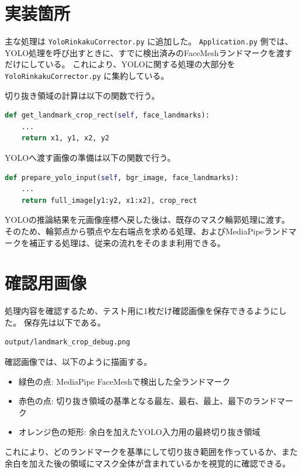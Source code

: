 \documentclass[uplatex,dvipdfmx]{jsarticle}
\begin{document}
\section{実装箇所}

主な処理は \verb|YoloRinkakuCorrector.py| に追加した。
\verb|Application.py| 側では、YOLO処理を呼び出すときに、すでに検出済みのFaceMeshランドマークを渡すだけにしている。
これにより、YOLOに関する処理の大部分を \verb|YoloRinkakuCorrector.py| に集約している。

切り抜き領域の計算は以下の関数で行う。

\begin{lstlisting}[language=Python]
def get_landmark_crop_rect(self, face_landmarks):
    ...
    return x1, y1, x2, y2
\end{lstlisting}

YOLOへ渡す画像の準備は以下の関数で行う。

\begin{lstlisting}[language=Python]
def prepare_yolo_input(self, bgr_image, face_landmarks):
    ...
    return full_image[y1:y2, x1:x2], crop_rect
\end{lstlisting}

YOLOの推論結果を元画像座標へ戻した後は、既存のマスク輪郭処理に渡す。
そのため、輪郭点から顎点や左右端点を求める処理、およびMediaPipeランドマークを補正する処理は、従来の流れをそのまま利用できる。

\section{確認用画像}

処理内容を確認するため、テスト用に1枚だけ確認画像を保存できるようにした。
保存先は以下である。

\begin{lstlisting}
output/landmark_crop_debug.png
\end{lstlisting}

確認画像では、以下のように描画する。

\begin{itemize}
  \item 緑色の点: MediaPipe FaceMeshで検出した全ランドマーク
  \item 赤色の点: 切り抜き領域の基準となる最左、最右、最上、最下のランドマーク
  \item オレンジ色の矩形: 余白を加えたYOLO入力用の最終切り抜き領域
\end{itemize}

これにより、どのランドマークを基準にして切り抜き範囲を作っているか、また余白を加えた後の領域にマスク全体が含まれているかを視覚的に確認できる。
\end{document}
